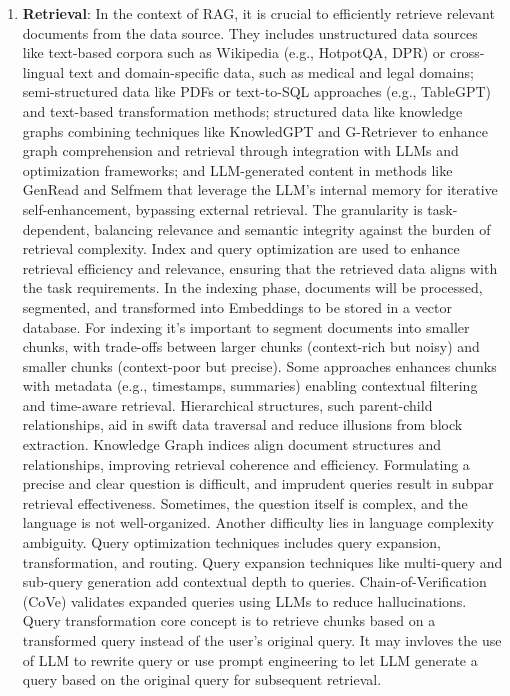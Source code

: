 \begin{enumerate}

	\item {
	      \textbf{Retrieval}: In the context of RAG, it is crucial to efficiently retrieve relevant documents from the data source. They includes unstructured data sources like text-based corpora such as Wikipedia (e.g., HotpotQA, DPR) or cross-lingual text and domain-specific data, such as medical and legal domains; semi-structured data like PDFs or text-to-SQL approaches (e.g., TableGPT) and text-based transformation methods; structured data like knowledge graphs  combining techniques like KnowledGPT and G-Retriever to enhance graph comprehension and retrieval through integration with LLMs and optimization frameworks; and LLM-generated content in methods like GenRead and Selfmem that leverage the LLM’s internal memory for iterative self-enhancement, bypassing external retrieval.
	      The granularity is task-dependent, balancing relevance and semantic integrity against the burden of retrieval complexity.
	      Index and query optimization are used to enhance retrieval efficiency and relevance, ensuring that the retrieved data aligns with the task requirements.
	      In the indexing phase, documents will be processed, segmented, and transformed into Embeddings to be stored in a vector database.
	      For indexing it's important to segment documents into smaller chunks, with trade-offs between larger chunks (context-rich but noisy) and smaller chunks (context-poor but precise). Some approaches enhances chunks with metadata (e.g., timestamps, summaries) enabling contextual filtering and time-aware retrieval.
	      Hierarchical structures, such parent-child relationships, aid in swift data traversal and reduce illusions from block extraction. Knowledge Graph indices align document structures and relationships, improving retrieval coherence and efficiency.
	      Formulating a precise and clear question is difficult, and imprudent queries result in subpar retrieval effectiveness. Sometimes, the question itself is complex, and the language is not well-organized. Another difficulty lies in language complexity ambiguity.
	      Query optimization techniques includes query expansion, transformation, and routing.
	      Query expansion techniques like multi-query and sub-query generation add contextual depth to queries.
	      Chain-of-Verification (CoVe) validates expanded queries using LLMs to reduce hallucinations.
	      Query transformation core concept is to retrieve chunks based on a transformed query instead of the user’s original query. It may invloves the use of LLM to rewrite query or use prompt engineering to let LLM generate a query based on the original query for subsequent retrieval.
}
\end{enumerate}
